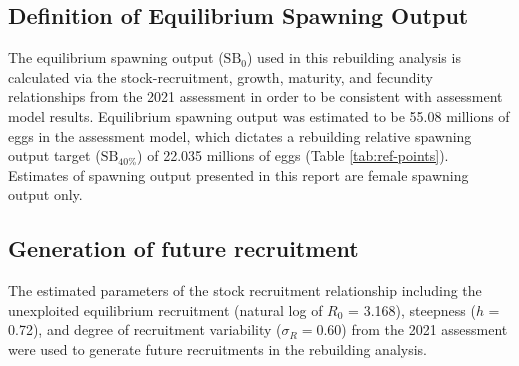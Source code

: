 \documentclass[11pt,
  english,
  a4paper,
]{article}
\begin{document}

\hypertarget{definition-of-equilibrium-spawning-output}{%
\subsection{Definition of Equilibrium Spawning Output}\label{definition-of-equilibrium-spawning-output}}

\leavevmode\tagmcend\tagstructend


The equilibrium spawning output ({\(\text{SB}_0\)\leavevmode\tagmcend\tagstructend}) used in this rebuilding analysis is calculated via the stock-recruitment, growth, maturity, and fecundity relationships from the 2021 assessment in order to be consistent with assessment model results. Equilibrium spawning output was estimated to be 55.08 millions of eggs in the assessment model, which dictates a rebuilding relative spawning output target ({\(\text{SB}_{40\%}\)\leavevmode\tagmcend\tagstructend}) of 22.035 millions of eggs (Table \ref{tab:ref-points}). Estimates of spawning output presented in this report are female spawning output only.

\leavevmode\tagmcend\tagstructend\par


\hypertarget{generation-of-future-recruitment}{%
\subsection{Generation of future recruitment}\label{generation-of-future-recruitment}}

\leavevmode\tagmcend\tagstructend


The estimated parameters of the stock recruitment relationship including the unexploited equilibrium recruitment (natural log of {\(R_0\)\leavevmode\tagmcend\tagstructend} = 3.168), steepness ({\(h\)\leavevmode\tagmcend\tagstructend} = 0.72), and degree of recruitment variability ({\(\sigma_R = 0.60\)\leavevmode\tagmcend\tagstructend}) from the 2021 assessment were used to generate future recruitments in the rebuilding analysis.
\end{document}
